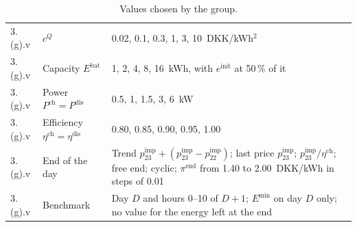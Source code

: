 \documentclass[12pt,oneside,a4paper,english]{article}
\newcommand{\pimp}[1][t]{p^{\mathrm{imp}}_{#1}}        %
\newcommand{\Emin}{E^{\min}}
\newcommand{\Ebat}{E^{\mathrm{bat}}}
\newcommand{\Pch}{P^{\mathrm{ch}}}
\newcommand{\Pdis}{P^{\mathrm{dis}}}
\newcommand{\etach}{\eta^{\mathrm{ch}}}
\newcommand{\etadis}{\eta^{\mathrm{dis}}}
\newcommand{\einit}{e^{\mathrm{init}}}
\newcommand{\piend}{\pi^{\mathrm{end}}}
\begin{document}
\begin{table}[H]
\begin{tabularx}{\textwidth}{llX}
3.(g).v & $c^{Q}$ & 0.02, 0.1, 0.3, 1, 3, 10~DKK/kWh$^2$ \\
3.(g).v & Capacity $\Ebat$ & 1, 2, 4, 8, 16~kWh, with $\einit$ at 50\,\% of it \\
3.(g).v & Power $\Pch = \Pdis$ & 0.5, 1, 1.5, 3, 6~kW \\
3.(g).v & Efficiency $\etach = \etadis$ & 0.80, 0.85, 0.90, 0.95, 1.00 \\
3.(g).v & End of the day & Trend $\pimp[23] + (\pimp[23] - \pimp[22])$; last price $\pimp[23]$; $\pimp[23]/\etach$; free end; cyclic; $\piend$ from 1.40 to 2.00~DKK/kWh in steps of 0.01 \\
3.(g).v & Benchmark & Day $D$ and hours 0--10 of $D+1$; $\Emin$ on day $D$ only; no value for the energy left at the end \\
\bottomrule
\end{tabularx}
\caption{Values chosen by the group.}
\label{tab:appendix}
\end{table}




\label{endOfDoc}
\label{EndOfText}
\end{document}
